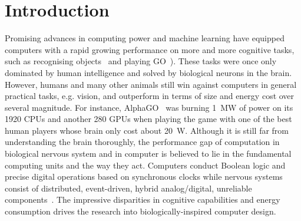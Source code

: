 \chapter{Introduction}
\label{cha:intro}

Promising advances in computing power and machine learning have equipped computers with a rapid growing performance on more and more cognitive tasks, such as recognising objects~\cite{deng2009imagenet} and playing GO~\cite{silver2016mastering}). 
These tasks were once only dominated by human intelligence and solved by biological neurons in the brain.
However, humans and many other animals still win against computers in general practical tasks, e.g. vision, and outperform in terms of size and energy cost over several magnitude.
For instance, AlphaGO~\cite{silver2016mastering} was burning 1~MW of power on its 1920 CPUs and another 280 GPUs when playing the game with one of the best human players whose brain only cost about 20~W.
Although it is still far from understanding the brain thoroughly, the performance gap of computation in biological nervous system and in computer is believed to lie in the fundamental computing units and the way they act.
Computers conduct Boolean logic and precise digital operations based on synchronous clocks while nervous systems consist of distributed, event-driven, hybrid analog/digital, unreliable components~\cite{indiveri2009artificial}.
The impressive disparities in cognitive capabilities and energy consumption drives the research into biologically-inspired computer design.



